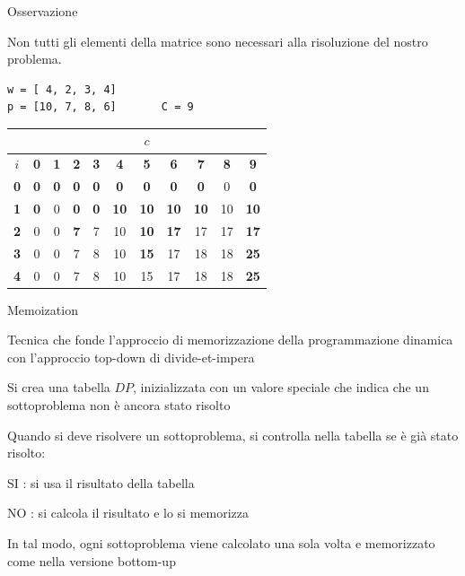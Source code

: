 \begin{frame}[fragile]{Osservazione}

\vspace{-9pt}
Non tutti gli elementi della matrice sono necessari alla risoluzione del
nostro problema.

\vspace{-6pt}
\begin{lstlisting}
w = [ 4, 2, 3, 4]
p = [10, 7, 8, 6]       C = 9  
\end{lstlisting}

\bigskip
\begin{tabular}{|c|c|c|c|c|c|c|c|c|c|c|}
\hline
& \multicolumn{10}{c|}{$c$} \\\hline
$i$ & \textbf{0} & \textbf{1} & \textbf{2} & \textbf{3} & \textbf{4} & \textbf{5} & \textbf{6} & \textbf{7} & \textbf{8} & \textbf{9}  \\\hline
\bf{0} & \alert{\bf 0} &  \alert{\bf 0} &  \alert{\bf 0} &  \alert{\bf 0} &  \alert{\bf 0} &  \alert{\bf 0} &  \alert{\bf 0} &  \alert{\bf 0} &  0 &  \alert{\bf 0} \\\hline
\bf{1} & \alert{\bf 0} &  0 &  \alert{\bf 0} & \alert{\bf 0} & \alert{\bf 10} & \alert{\bf 10} & \alert{\bf 10} & \alert{\bf 10} & 10 & \alert{\bf 10} \\\hline
\bf{2} & 0 &  0 &  \alert{\bf 7} &  7 & 10 & \alert{\bf 10} & \alert{\bf 17} & 17 & 17 & \alert{\bf 17} \\\hline
\bf{3} & 0 &  0 &  7 &  8 & 10 & \alert{\bf 15} & 17 & 18 & 18 & \alert{\bf 25} \\\hline
\bf{4} & 0 &  0 &  7 &  8 & 10 & 15 & 17 & 18 & 18 & \alert{\bf 25} \\\hline  
\end{tabular}  
  
\end{frame}


\begin{frame}{Memoization}

\vspace{-9pt}
\begin{myboxtitle}
Tecnica che fonde l'approccio di memorizzazione della programmazione dinamica con l'approccio \alert{top-down} di divide-et-impera
\end{myboxtitle}

\BIL
\item Si crea una tabella $\mathit{DP}$, inizializzata con un \alert{valore speciale} che 
indica che un sottoproblema non è ancora stato risolto
\item Quando si deve risolvere un sottoproblema, si controlla nella tabella se è già stato risolto:
\BI
\item[\alert{SI}]:  si usa il risultato della tabella
\item[\alert{NO}]:  si calcola il risultato e lo si memorizza
\EI
\item In tal modo, ogni sottoproblema viene calcolato una sola volta e memorizzato come nella versione bottom-up
\EIL

\end{frame}

